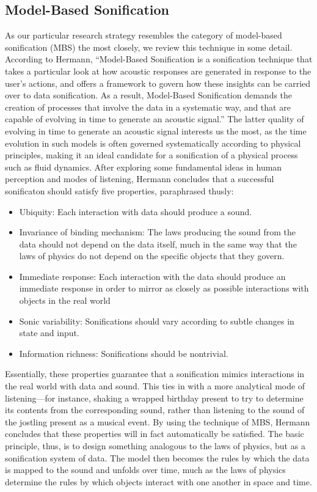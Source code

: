 \subsection{Model-Based Sonification}
\label{sec:modelbased}
As our particular research strategy resembles the category of model-based sonification (MBS) the most closely, we review this technique in some detail.
According to Hermann, ``Model-Based Sonification is a sonification technique that takes a
particular look at how acoustic responses are generated in response to the user’s actions, and
offers a framework to govern how these insights can be carried over to data sonification. As
a result, Model-Based Sonification demands the creation of processes that involve the data in
a systematic way, and that are capable of evolving in time to generate an acoustic signal.'' \cite{hermann2011sonification} The latter quality of evolving in time to generate an acoustic signal interests us the most, as the time evolution in such models is often governed systematically according to physical principles, making it an ideal candidate for a sonification of a physical process such as fluid dynamics. After exploring some fundamental ideas in human perception and modes of listening, Hermann concludes that a successful sonificaton should satisfy five properties, paraphrased thusly:
\begin{itemize}
	\item Ubiquity: Each interaction with data should produce a sound.
	\item Invariance of binding mechanism: The laws producing the sound from the data should not depend on the data itself, much in the same way that the
	laws of physics do not depend on the specific objects that they govern.
	\item Immediate response: Each interaction with the data should produce an immediate response in order to mirror as closely as possible interactions with objects in the real world
	\item Sonic variability: Sonifications should vary according to subtle changes in state and input.
	\item Information richness: Sonifications should be nontrivial.
\end{itemize}
Essentially, these properties guarantee that a sonification mimics interactions in the real world with data and sound. This ties in with a more analytical mode of listening---for instance, shaking a wrapped birthday present to try to determine its contents from the corresponding sound, rather than listening to the sound of the jostling present as a musical event. By using the technique of MBS, Hermann concludes that these properties will in fact automatically be satisfied. The basic principle, thus, is to design something analogous to the laws of physics, but as a sonification system of data. The model then becomes the rules by which the data is mapped to the sound and unfolds over time, much as the laws of physics determine the rules by which objects interact with one another in space and time.

